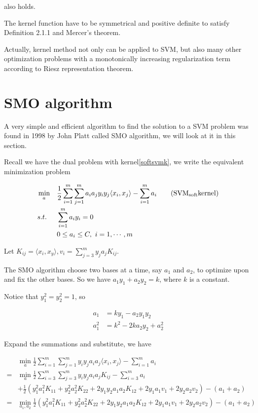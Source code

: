 \documentclass[a4paper]{report}
\begin{document}
also holds. 

The kernel function have to be symmetrical and positive definite to satisfy Definition 2.1.1 and Mercer's theorem.

Actually, kernel method not only can be applied to SVM, but also many other optimization problems with a monotonically increasing regularization term according to Riesz representation theorem.
\section{SMO algorithm}

A very simple and efficient algorithm to find the solution to a SVM problem was found in 1998 by John Platt called SMO algorithm\cite{platt1998sequential}, we will look at it in this section.

Recall we have the dual problem with kernel\ref{softsvmk}, we write the equivalent minimization problem

\begin{align*}
    &\min_a & & \frac{1}{2} \sum_{i=1}^m\sum_{j=1}^m a_i a_j y_i y_j \langle x_i, x_j\rangle - \sum_{i=1}^m a_i  \label{softsvmm}\tag{$\mathrm{SVM_{soft} kernel}$}\\
    &s.t. \ & & \sum_{i=1}^m a_i y_i=0 \\
    & & & 0\leq a_i \leq C,\ i=1,\cdots,m 
\end{align*}

Let $K_{ij}=\langle x_i,x_y\rangle, v_i=\sum_{j=3}^m y_j a_j K_{ij}$.

The SMO algorithm choose two bases at a time, say $a_1$ and $a_2$, to optimize upon and fix the other bases. So we have $a_1 y_1 + a_2 y_2=k$, where $k$ is a constant. 

Notice that $y_1^2=y_2^2=1$, so 

\begin{align}
    a_1&=ky_1-a_2y_1y_2\\
    a_1^2&=k^2-2ka_2y_2 + a_2^2
\end{align}

Expand the summations and substitute, we have

\begin{align}
    &\min_a \frac{1}{2}\sum_{i=1}^m\sum_{j=1}^m y_iy_ja_ia_j\langle x_i,x_j\rangle - \sum_{i=1}^m a_i \\
    =&\min_a \frac{1}{2}\sum_{i=3}^m\sum_{j=3}^m y_i y_j a_i a_j K_{ij} - \sum_{i=3}^m a_i \\
     &+\frac{1}{2}(y_1^2 a_1^2 K_{11}+y_2^2 a_2^2 K_{22} + 2y_1y_2 a_1a_2 K_{12} 
     +2y_1a_1v_1 + 2y_2a_2v_2) - (a_1+a_2) \\
    =&\min_{a_1,a_2} \frac{1}{2}(y_1^2 a_1^2 K_{11}+y_2^2 a_2^2 K_{22} + 2y_1y_2 a_1a_2 K_{12} 
     +2y_1a_1v_1 + 2y_2a_2v_2) - (a_1+a_2) 
\end{align}
\end{document}
